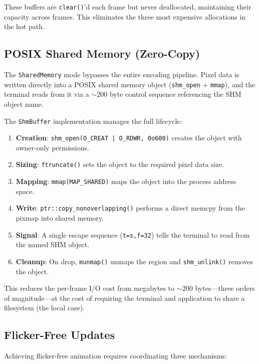 \documentclass[11pt, a4paper, twocolumn]{article}
\begin{document}
These buffers are \texttt{clear()}'d each frame but never deallocated, maintaining their capacity across frames.
This eliminates the three most expensive allocations in the hot path.

\subsection{POSIX Shared Memory (Zero-Copy)}

The \texttt{SharedMemory} mode bypasses the entire encoding pipeline.
Pixel data is written directly into a POSIX shared memory object (\texttt{shm\_open} + \texttt{mmap}), and the terminal reads from it via a $\sim$200 byte control sequence referencing the SHM object name.

The \texttt{ShmBuffer} implementation manages the full lifecycle:

\begin{enumerate}[leftmargin=1.5em, itemsep=0.1em]
    \item \textbf{Creation}: \texttt{shm\_open(O\_CREAT | O\_RDWR, 0o600)} creates the object with owner-only permissions.
    \item \textbf{Sizing}: \texttt{ftruncate()} sets the object to the required pixel data size.
    \item \textbf{Mapping}: \texttt{mmap(MAP\_SHARED)} maps the object into the process address space.
    \item \textbf{Write}: \texttt{ptr::copy\_nonoverlapping()} performs a direct memcpy from the pixmap into shared memory.
    \item \textbf{Signal}: A single escape sequence (\texttt{t=s,f=32}) tells the terminal to read from the named SHM object.
    \item \textbf{Cleanup}: On drop, \texttt{munmap()} unmaps the region and \texttt{shm\_unlink()} removes the object.
\end{enumerate}

This reduces the per-frame I/O cost from megabytes to $\sim$200 bytes---three orders of magnitude---at the cost of requiring the terminal and application to share a filesystem (the local case).

\subsection{Flicker-Free Updates}

Achieving flicker-free animation requires coordinating three mechanisms:
\end{document}
